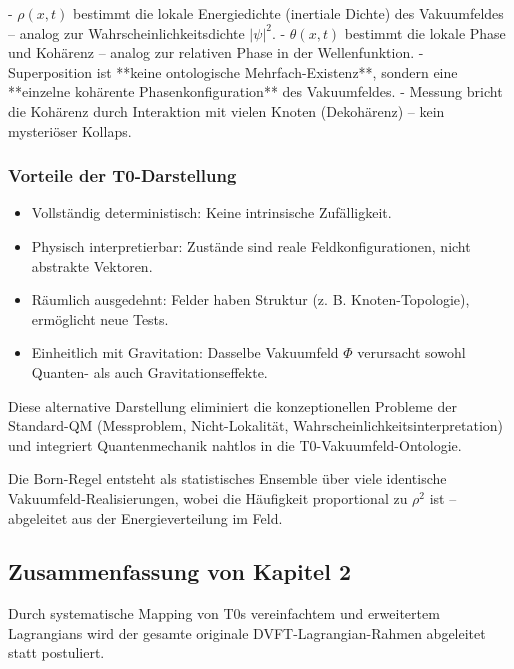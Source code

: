 \documentclass[12pt,a4paper]{article}
\begin{document}
	- $\rho(x,t)$ bestimmt die lokale Energiedichte (inertiale Dichte) des Vakuumfeldes – analog zur Wahrscheinlichkeitsdichte $|\psi|^2$.
	- $\theta(x,t)$ bestimmt die lokale Phase und Kohärenz – analog zur relativen Phase in der Wellenfunktion.
	- Superposition ist **keine ontologische Mehrfach-Existenz**, sondern eine **einzelne kohärente Phasenkonfiguration** des Vakuumfeldes.
	- Messung bricht die Kohärenz durch Interaktion mit vielen Knoten (Dekohärenz) – kein mysteriöser Kollaps.
	
	\subsubsection{Vorteile der T0-Darstellung}
	
	\begin{itemize}
		\item Vollständig deterministisch: Keine intrinsische Zufälligkeit.
		\item Physisch interpretierbar: Zustände sind reale Feldkonfigurationen, nicht abstrakte Vektoren.
		\item Räumlich ausgedehnt: Felder haben Struktur (z. B. Knoten-Topologie), ermöglicht neue Tests.
		\item Einheitlich mit Gravitation: Dasselbe Vakuumfeld $\Phi$ verursacht sowohl Quanten- als auch Gravitationseffekte.
	\end{itemize}
	
	Diese alternative Darstellung eliminiert die konzeptionellen Probleme der Standard-QM (Messproblem, Nicht-Lokalität, Wahrscheinlichkeitsinterpretation) und integriert Quantenmechanik nahtlos in die T0-Vakuumfeld-Ontologie.
	
	Die Born-Regel entsteht als statistisches Ensemble über viele identische Vakuumfeld-Realisierungen, wobei die Häufigkeit proportional zu $\rho^2$ ist – abgeleitet aus der Energieverteilung im Feld.
	
	\subsection{Zusammenfassung von Kapitel 2}
	
	Durch systematische Mapping von T0s vereinfachtem und erweitertem Lagrangians wird der gesamte originale DVFT-Lagrangian-Rahmen abgeleitet statt postuliert.
	
\end{document}
